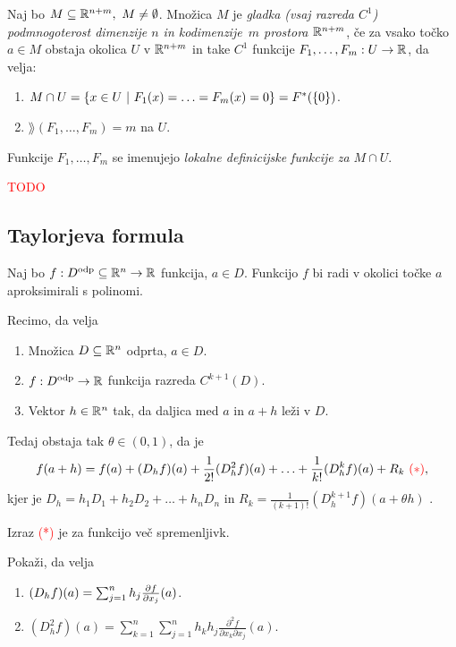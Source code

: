 \begin{definicija}
    Naj bo $M \subseteq \mathbb{R}^{n+m}, \ M \neq \emptyset$. Množica $M$ je \emph{gladka (vsaj razreda $C^1$) podmnogoterost dimenzije $n$ in kodimenzije~$m$ prostora $\mathbb{R}^{n+m}$}, če 
    za vsako točko $a \in M$ obstaja okolica $U$ v $\mathbb{R}^{n+m}$ in take $C^1$ funkcije $F_1, \ldots, F_m: U \to \mathbb{R}$, da velja:
    \begin{enumerate}
        \item $M \cap U = \left\{x \in U \ | \ F_1(x) = \ldots = F_m(x) = 0\right\} = F^*(\left\{0\right\})$.
        \item $\rang(F_1, \ldots, F_m) = m$ na $U$.
    \end{enumerate}
\end{definicija}

\begin{opomba}
    Funkcije $F_1, \ldots, F_m$ se imenujejo \emph{lokalne definicijske funkcije za $M \cap U$}.
\end{opomba}

\textcolor{red}{TODO}

\subsection{Taylorjeva formula}
Naj bo $f: D^{\text{odp}} \subseteq \mathbb{R}^n \to \mathbb{R}$ funkcija, $a \in D$. Funkcijo $f$ bi radi v okolici točke $a$ aproksimirali s polinomi.

\begin{izrek}
    Recimo, da velja
    \begin{enumerate}
        \item Množica $D \subseteq \mathbb{R}^n$ odprta, $a \in D$.
        \item $f: D^{\text{odp}} \to \mathbb{R}$ funkcija razreda $C^{k+1}(D)$.
        \item Vektor $h \in \mathbb{R}^n$ tak, da daljica med $a$ in $a+h$ leži v $D$.
    \end{enumerate}
    Tedaj obstaja tak $\theta \in (0,1)$, da je 
    $$f(a+h) = f(a) + (D_hf)(a) + \frac{1}{2!}(D_h^2f)(a) + \ldots + \frac{1}{k!} (D_h^kf)(a) + R_k \ \textcolor{red}{(*)},$$
    kjer je $D_h = h_1D_1 + h_2D_2 + \ldots + h_nD_n$  in $R_k = \frac{1}{(k+1)!} (D_h^{k+1}f)(a + \theta h)$ .

    Izraz \textcolor{red}{(*)} je  za funkcijo več spremenljivk.
\end{izrek}

\begin{opomba}
    Pokaži, da velja
    \begin{enumerate}
        \item $(D_hf)(a) = \sum_{j=1}^{n}h_j \frac{\partial f}{\partial x_j}(a)$.
        \item $(D_h^2f)(a) = \sum_{k=1}^{n} \sum_{j=1}^{n}h_kh_j \frac{\partial^2f}{\partial x_k \partial x_j}(a)$. 
    \end{enumerate}
\end{opomba}

